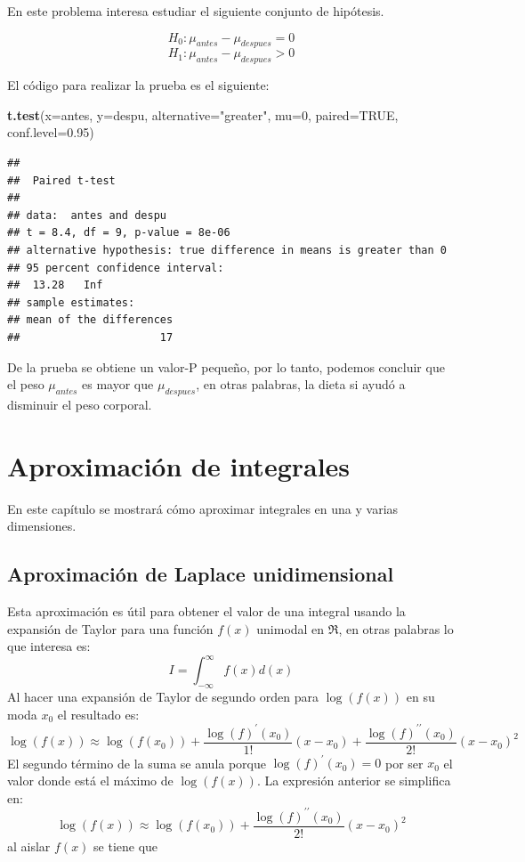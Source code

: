 \documentclass[10pt,]{krantz}
\makeatletter
\newenvironment{Shaded}{\begin{snugshade}}{\end{snugshade}}
\newcommand{\KeywordTok}[1]{\textcolor[rgb]{0.13,0.29,0.53}{\textbf{{#1}}}}
\newcommand{\DataTypeTok}[1]{\textcolor[rgb]{0.13,0.29,0.53}{{#1}}}
\newcommand{\DecValTok}[1]{\textcolor[rgb]{0.00,0.00,0.81}{{#1}}}
\newcommand{\FloatTok}[1]{\textcolor[rgb]{0.00,0.00,0.81}{{#1}}}
\newcommand{\StringTok}[1]{\textcolor[rgb]{0.31,0.60,0.02}{{#1}}}
\newcommand{\OtherTok}[1]{\textcolor[rgb]{0.56,0.35,0.01}{{#1}}}
\newcommand{\NormalTok}[1]{{#1}}
\newenvironment{kframe}{%
\medskip{}
\setlength{\fboxsep}{.8em}
 \def\at@end@of@kframe{}%
 \ifinner\ifhmode%
  \def\at@end@of@kframe{\end{minipage}}%
  \begin{minipage}{\columnwidth}%
 \fi\fi%
 \def\FrameCommand##1{\hskip\@totalleftmargin \hskip-\fboxsep
 \colorbox{shadecolor}{##1}\hskip-\fboxsep
     \hskip-\linewidth \hskip-\@totalleftmargin \hskip\columnwidth}%
 \MakeFramed {\advance\hsize-\width
   \@totalleftmargin\z@ \linewidth\hsize
   \@setminipage}}%
 {\par\unskip\endMakeFramed%
 \at@end@of@kframe}
\renewenvironment{Shaded}{\begin{kframe}}{\end{kframe}}
\makeatother
\begin{document}
En este problema interesa estudiar el siguiente conjunto de hipótesis.

\[H_0: \mu_{antes}  - \mu_{despues} = 0\]
\[H_1: \mu_{antes}  - \mu_{despues} > 0\]

El código para realizar la prueba es el siguiente:

\begin{Shaded}
\begin{Highlighting}[]
\KeywordTok{t.test}\NormalTok{(}\DataTypeTok{x=}\NormalTok{antes, }\DataTypeTok{y=}\NormalTok{despu, }\DataTypeTok{alternative=}\StringTok{"greater"}\NormalTok{, }\DataTypeTok{mu=}\DecValTok{0}\NormalTok{, }
       \DataTypeTok{paired=}\OtherTok{TRUE}\NormalTok{, }\DataTypeTok{conf.level=}\FloatTok{0.95}\NormalTok{)}
\end{Highlighting}
\end{Shaded}

\begin{verbatim}
## 
##  Paired t-test
## 
## data:  antes and despu
## t = 8.4, df = 9, p-value = 8e-06
## alternative hypothesis: true difference in means is greater than 0
## 95 percent confidence interval:
##  13.28   Inf
## sample estimates:
## mean of the differences 
##                      17
\end{verbatim}

De la prueba se obtiene un valor-P pequeño, por lo tanto, podemos
concluir que el peso \(\mu_{antes}\) es mayor que \(\mu_{despues}\), en
otras palabras, la dieta si ayudó a disminuir el peso corporal.

\chapter{\texorpdfstring{Aproximación de integrales
\label{aproxint}}{Aproximación de integrales }}\label{aproximacion-de-integrales}

En este capítulo se mostrará cómo aproximar integrales en una y varias
dimensiones.

\section{Aproximación de Laplace
unidimensional}\label{aproximacion-de-laplace-unidimensional}

Esta aproximación es útil para obtener el valor de una integral usando
la expansión de Taylor para una función \(f(x)\) unimodal en \(\Re\), en
otras palabras lo que interesa es:
\[ I = \int_{-\infty}^{\infty} f(x) d(x)\] Al hacer una expansión de
Taylor de segundo orden para \(\log(f(x))\) en su moda \(x_0\) el
resultado es:
\[ \log(f(x)) \approx \log(f(x_0)) + \frac{\log(f)^\prime(x_0)}{1!} (x-x_0) + \frac{\log(f)^{\prime \prime}(x_0)}{2!} (x-x_0)^2 \]
El segundo término de la suma se anula porque \(\log(f)^\prime(x_0)=0\)
por ser \(x_0\) el valor donde está el máximo de \(\log(f(x))\). La
expresión anterior se simplifica en:
\[ \log(f(x)) \approx \log(f(x_0)) + \frac{\log(f)^{\prime \prime}(x_0)}{2!} (x-x_0)^2 \]
al aislar \(f(x)\) se tiene que
\end{document}
